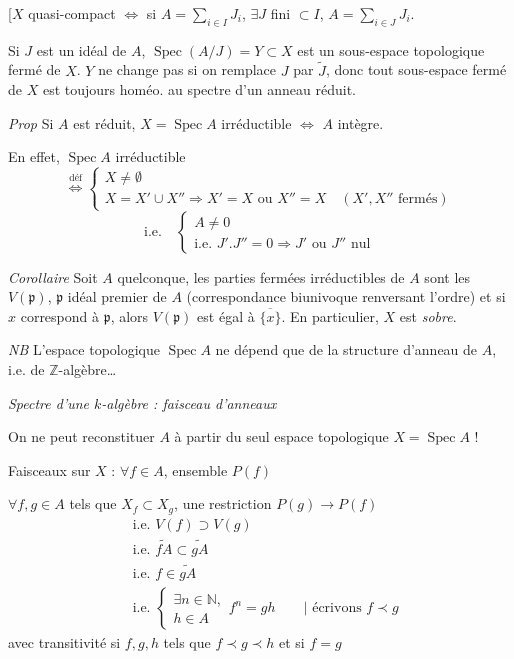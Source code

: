 \documentclass[11pt,a4paper]{article}
\begin{document}
[$X$ quasi-compact $\Longleftrightarrow$ si $A = \sum_{i \in I} J_i$, $\exists J$ fini $\subset I$, $A = \sum_{i \in J} J_i$.

\struck{\ill{}}

Si $J$ est un idéal de $A$, $\operatorname{Spec}(A/J) = Y \subset X$ est un sous-espace topologique fermé de $X$.  $Y$ ne change pas si on remplace $J$ par $\widetilde{J}$, donc \struck{\ill{}} tout sous-espace fermé de $X$ est toujours homéo. au spectre d'un anneau réduit.

\emph{Prop} Si $A$ est réduit, $X = \operatorname{Spec} A$ irréductible $\Longleftrightarrow$ $A$ intègre.

En effet, $\operatorname{Spec} A$ irréductible
\[
\overset{\text{déf}}{\Longleftrightarrow}
\begin{cases}
X \neq \emptyset \\
X = X' \cup X'' \Rightarrow X' = X \text{ ou } X'' = X \quad (X', X'' \text{ fermés})
\end{cases}
\]
\[
\text{i.e.} \quad
\begin{cases}
A \neq 0 \\
\text{i.e. } J' . J'' = 0 \Rightarrow J' \text{ ou } J'' \text{ nul}
\end{cases}
\]

\emph{Corollaire} Soit $A$ quelconque,  les parties fermées irréductibles de $A$ sont les $V(\mathfrak{p})$, $\mathfrak{p}$ idéal premier de $A$ (correspondance biunivoque renversant l'ordre) et si $x$ correspond à $\mathfrak{p}$, alors $V(\mathfrak{p})$ est égal à $\overline{\{x\}}$. En particulier, $X$ est \emph{sobre}.

\quad \emph{NB} L'espace topologique $\operatorname{Spec} A$ ne dépend que de la structure d'anneau de $A$, i.e. de $\mathbb{Z}$-algèbre…

\emph{Spectre d'une $k$-algèbre : faisceau d'anneaux}

On ne peut reconstituer $A$ à partir du seul espace topologique $X = \operatorname{Spec} A$ !

Faisceaux sur $X$ : \quad $\forall f \in A$, ensemble $P(f)$

$\forall f, g \in A$ tels que $X_f \subset X_g$, une restriction $P(g) \to P(f)$
\[
\begin{aligned}
&\text{i.e. } V(f) \supset V(g) \\
&\text{i.e. } \widetilde{fA} \subset \widetilde{gA} \\
&\text{i.e. } f \in \widetilde{gA} \\
&\text{i.e. } \begin{cases} \exists n \in \mathbb{N}, \\ h \in A \end{cases} f^n = gh \qquad \Big| \text{ écrivons } f \prec g
\end{aligned}
\]
avec transitivité si $f, g, h$ tels que $f \prec g \prec h$ \quad et  si $f = g$
\end{document}
